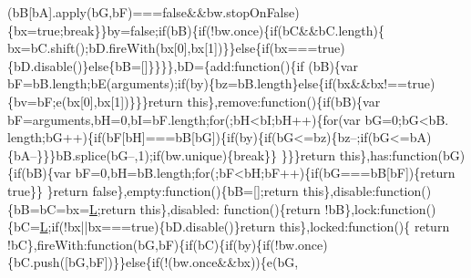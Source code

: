 \begin{DoxyCode}
      (bB[bA].apply(bG,bF)===\textcolor{keyword}{false}&&bw.stopOnFalse)\{bx=\textcolor{keyword}{true};\textcolor{keywordflow}{break}\}\}by=\textcolor{keyword}{false};\textcolor{keywordflow}{if}(bB)\{\textcolor{keywordflow}{if}(!bw.once)\{\textcolor{keywordflow}{if}(bC&&bC.length)\{
      bx=bC.shift();bD.fireWith(bx[0],bx[1])\}\}\textcolor{keywordflow}{else}\{\textcolor{keywordflow}{if}(bx===\textcolor{keyword}{true})\{bD.disable()\}\textcolor{keywordflow}{else}\{bB=[]\}\}\}\},bD=\{add:\textcolor{keyword}{function}()\{\textcolor{keywordflow}{if}
      (bB)\{var bF=bB.length;bE(arguments);\textcolor{keywordflow}{if}(by)\{bz=bB.length\}\textcolor{keywordflow}{else}\{\textcolor{keywordflow}{if}(bx&&bx!==\textcolor{keyword}{true})\{bv=bF;e(bx[0],bx[1])\}\}\}\textcolor{keywordflow}{return}
       \textcolor{keyword}{this}\},\textcolor{keyword}{remove}:\textcolor{keyword}{function}()\{\textcolor{keywordflow}{if}(bB)\{var bF=arguments,bH=0,bI=bF.length;\textcolor{keywordflow}{for}(;bH<bI;bH++)\{\textcolor{keywordflow}{for}(var bG=0;bG<bB.
      length;bG++)\{\textcolor{keywordflow}{if}(bF[bH]===bB[bG])\{\textcolor{keywordflow}{if}(by)\{\textcolor{keywordflow}{if}(bG<=bz)\{bz--;\textcolor{keywordflow}{if}(bG<=bA)\{bA--\}\}\}bB.splice(bG--,1);\textcolor{keywordflow}{if}(bw.unique)\{\textcolor{keywordflow}{break}\}\}
      \}\}\}\textcolor{keywordflow}{return} \textcolor{keyword}{this}\},has:\textcolor{keyword}{function}(bG)\{\textcolor{keywordflow}{if}(bB)\{var bF=0,bH=bB.length;\textcolor{keywordflow}{for}(;bF<bH;bF++)\{\textcolor{keywordflow}{if}(bG===bB[bF])\{\textcolor{keywordflow}{return} \textcolor{keyword}{true}\}\}
      \}\textcolor{keywordflow}{return} \textcolor{keyword}{false}\},empty:\textcolor{keyword}{function}()\{bB=[];\textcolor{keywordflow}{return} \textcolor{keyword}{this}\},disable:\textcolor{keyword}{function}()\{bB=bC=bx=\hyperlink{docs_2_programmer's_manual_2html_2jquery_8js_a38ee4c0b5f4fe2a18d0c783af540d253}{L};\textcolor{keywordflow}{return} \textcolor{keyword}{this}\},disabled:\textcolor{keyword}{
      function}()\{\textcolor{keywordflow}{return} !bB\},lock:\textcolor{keyword}{function}()\{bC=\hyperlink{docs_2_programmer's_manual_2html_2jquery_8js_a38ee4c0b5f4fe2a18d0c783af540d253}{L};\textcolor{keywordflow}{if}(!bx||bx===\textcolor{keyword}{true})\{bD.disable()\}\textcolor{keywordflow}{return} \textcolor{keyword}{this}\},locked:\textcolor{keyword}{function}()\{\textcolor{keywordflow}{
      return} !bC\},fireWith:\textcolor{keyword}{function}(bG,bF)\{\textcolor{keywordflow}{if}(bC)\{\textcolor{keywordflow}{if}(by)\{\textcolor{keywordflow}{if}(!bw.once)\{bC.push([bG,bF])\}\}\textcolor{keywordflow}{else}\{\textcolor{keywordflow}{if}(!(bw.once&&bx))\{e(bG,

\end{DoxyCode}
